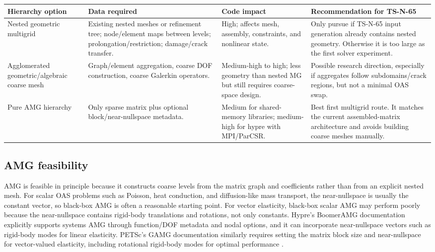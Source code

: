 \documentclass[10pt,a4paper]{article}
\begin{document}
\begin{table}[h]
\small
\centering
\begin{tabularx}{\textwidth}{L{0.22\textwidth} L{0.28\textwidth} L{0.21\textwidth} Y}
\toprule
Hierarchy option & Data required & Code impact & Recommendation for TS-N-65 \\
\midrule
Nested geometric multigrid & Existing nested meshes or refinement tree; node/element maps between levels; prolongation/restriction; damage/crack transfer. & High; affects mesh, assembly, constraints, and nonlinear state. & Only pursue if TS-N-65 input generation already contains nested geometry. Otherwise it is too large as the first solver experiment. \\
Agglomerated geometric/algebraic coarse mesh & Graph/element aggregation, coarse DOF construction, coarse Galerkin operators. & Medium-high to high; less geometry than nested MG but still requires coarse-space design. & Possible research direction, especially if aggregates follow subdomains/crack regions, but not a minimal OAS swap. \\
Pure AMG hierarchy & Only sparse matrix plus optional block/near-nullspace metadata. & Medium for shared-memory libraries; medium-high for hypre with MPI/ParCSR. & Best first multigrid route. It matches the current assembled-matrix architecture and avoids building coarse meshes manually. \\
\bottomrule
\end{tabularx}
\end{table}

\subsection*{AMG feasibility}

AMG is feasible in principle because it constructs coarse levels from the matrix graph and coefficients rather than from an explicit nested mesh. For scalar OAS problems such as Poisson, heat conduction, and diffusion-like mass transport, the near-nullspace is usually the constant vector, so black-box AMG is often a reasonable starting point. For vector elasticity, black-box scalar AMG may perform poorly because the near-nullspace contains rigid-body translations and rotations, not only constants. Hypre's BoomerAMG documentation explicitly supports systems AMG through function/DOF metadata and nodal options, and it can incorporate near-nullspace vectors such as rigid-body modes for linear elasticity. PETSc's GAMG documentation similarly requires setting the matrix block size and near-nullspace for vector-valued elasticity, including rotational rigid-body modes for optimal performance \cite{hypreboomer,petscksp,petscnear,petscgamg}.
\end{document}
